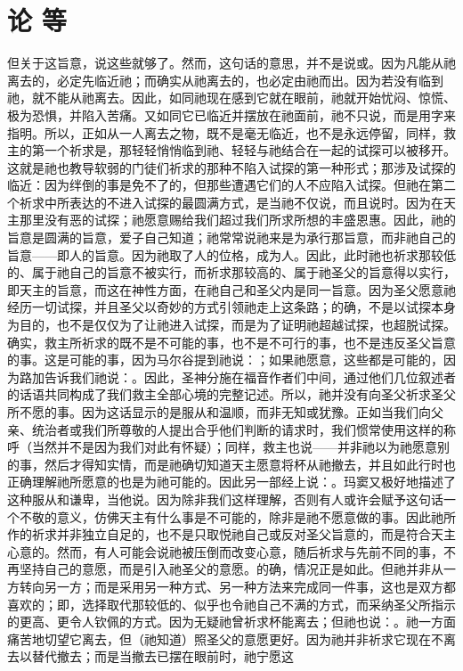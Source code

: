
\section{论 等}

但关于这旨意，说这些就够了。然而，这句话的意思，并不是说或。因为凡能从祂离去的，必定先临近祂；而确实从祂离去的，也必定由祂而出。因为若没有临到祂，就不能从祂离去。因此，如同祂现在感到它就在眼前，祂就开始忧闷、惊慌、极为恐惧，并陷入苦痛。又如同它已临近并摆放在祂面前，祂不只说，而是用字来指明。所以，正如从一人离去之物，既不是毫无临近，也不是永远停留，同样，救主的第一个祈求是，那轻轻悄悄临到祂、轻轻与祂结合在一起的试探可以被移开。这就是祂也教导软弱的门徒们祈求的那种不陷入试探的第一种形式；那涉及试探的临近：因为绊倒的事是免不了的，但那些遭遇它们的人不应陷入试探。但祂在第二个祈求中所表达的不进入试探的最圆满方式，是当祂不仅说，而且说时。因为在天主那里没有恶的试探；祂愿意赐给我们超过我们所求所想的丰盛恩惠。因此，祂的旨意是圆满的旨意，爱子自己知道；祂常常说祂来是为承行那旨意，而非祂自己的旨意——即人的旨意。因为祂取了人的位格，成为人。因此，此时祂也祈求那较低的、属于祂自己的旨意不被实行，而祈求那较高的、属于祂圣父的旨意得以实行，即天主的旨意，而这在神性方面，在祂自己和圣父内是同一旨意。因为圣父愿意祂经历一切试探，并且圣父以奇妙的方式引领祂走上这条路；的确，不是以试探本身为目的，也不是仅仅为了让祂进入试探，而是为了证明祂超越试探，也超脱试探。确实，救主所祈求的既不是不可能的事，也不是不可行的事，也不是违反圣父旨意的事。这是可能的事，因为马尔谷提到祂说：；如果祂愿意，这些都是可能的，因为路加告诉我们祂说：。因此，圣神分施在福音作者们中间，通过他们几位叙述者的话语共同构成了我们救主全部心境的完整记述。所以，祂并没有向圣父祈求圣父所不愿的事。因为这话显示的是服从和温顺，而非无知或犹豫。正如当我们向父亲、统治者或我们所尊敬的人提出合乎他们判断的请求时，我们惯常使用这样的称呼（当然并不是因为我们对此有怀疑）；同样，救主也说——并非祂以为祂愿意别的事，然后才得知实情，而是祂确切知道天主愿意将杯从祂撤去，并且如此行时也正确理解祂所愿意的也是为祂可能的。因此另一部经上说：。玛窦又极好地描述了这种服从和谦卑，当他说。因为除非我们这样理解，否则有人或许会赋予这句话一个不敬的意义，仿佛天主有什么事是不可能的，除非是祂不愿意做的事。因此祂所作的祈求并非独立自足的，也不是只取悦祂自己或反对圣父旨意的，而是符合天主心意的。然而，有人可能会说祂被压倒而改变心意，随后祈求与先前不同的事，不再坚持自己的意愿，而是引入祂圣父的意愿。的确，情况正是如此。但祂并非从一方转向另一方；而是采用另一种方式、另一种方法来完成同一件事，这也是双方都喜欢的；即，选择取代那较低的、似乎也令祂自己不满的方式，而采纳圣父所指示的更高、更令人钦佩的方式。因为无疑祂曾祈求杯能离去；但祂也说：。祂一方面痛苦地切望它离去，但（祂知道）照圣父的意愿更好。因为祂并非祈求它现在不离去以替代撤去；而是当撤去已摆在眼前时，祂宁愿这